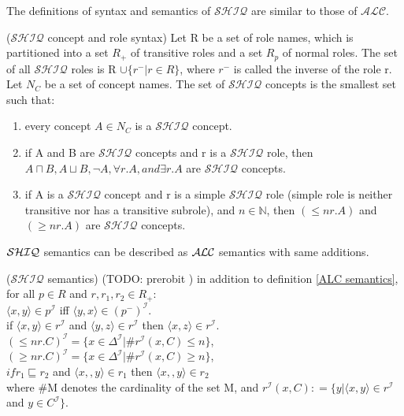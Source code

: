 The definitions of syntax and semantics of $\mathcal{SHIQ}$ are similar to those of $\mathcal{ALC}$.
\begin{mydef} 
\cite{handbook} ($\mathcal{SHIQ}$ concept and role syntax) Let R be a set of role names, which is partitioned into a set $R_+$ of transitive roles and a set $R_p$ of normal roles. 
The set of all $\mathcal{SHIQ}$ roles is R $\cup \{r^- | r \in R\}$, where $r^-$ is called the inverse of the role r. \\
Let $N_C$ be a set of concept names. The set of $\mathcal{SHIQ}$ concepts is the smallest set such that:  
\begin{enumerate}
\item every concept $A \in N_C$ is a $\mathcal{SHIQ}$ concept.
\item if A and B are $\mathcal{SHIQ}$ concepts and r is a $\mathcal{SHIQ}$ role, then $A\sqcap B, A\sqcup B,  \neg A, \forall r.A,  and \exists r.A$ are $\mathcal{SHIQ}$ concepts.
\item if A is a $\mathcal{SHIQ}$ concept and r is a simple $\mathcal{SHIQ}$ role (simple role is neither transitive nor has a transitive subrole), and $n \in \mathbb{N}$, then $(\leq n r.A)$  and 
$(\geq n r.A)$ are $\mathcal{SHIQ}$ concepts.
\end{enumerate}
\end{mydef}
$\mathcal{SHIQ}$ semantics can be described as $\mathcal{ALC}$ semantics with same additions.

 \begin{mydef}($\mathcal{SHIQ}$ semantics) \cite{handbook}
(TODO: prerobit )
in addition to definition \ref{ALC semantics}, for all  $p \in R$ and $r,r_1,r_2 \in R_+$: \\
 $\langle x,y \rangle \in p^\mathcal{I}$ iff  $\langle y,x \rangle \in (p^- )^\mathcal{I}$. \\
 if $\langle x,y \rangle \in r^\mathcal{I}$ and $ \langle y,z \rangle \in r^\mathcal{I}$ then $\langle x,z \rangle \in r^\mathcal{I}$.\\
 $(\leq n r.C)^\mathcal{I} = \{x \in \Delta ^\mathcal{I} | \# r^\mathcal{I} (x,C) \leq n\}$,\\
$(\geq n r.C)^\mathcal{I} = \{x \in \Delta ^\mathcal{I} | \# r^\mathcal{I} (x,C) \geq n\}$,\\
$ if r_1 \sqsubseteq r_2$ and $\langle x,,y \rangle \in r_1 $ then $\langle x,,y \rangle \in r_2 $\\
where \#M  denotes the cardinality of the set M, and $r^\mathcal{I} (x,C) \mathrel{\mathop:}= \{y | \langle x,y \rangle \in r^\mathcal{I}$ and $y \in C^\mathcal{I}\}$.
\end{mydef}

